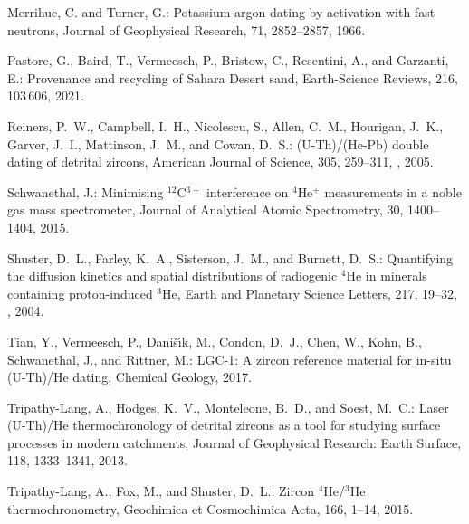 \documentclass{article}
\begin{document}
\begin{thebibliography}{24}
Merrihue, C. and Turner, G.: Potassium-argon dating by activation with fast
  neutrons, Journal of Geophysical Research, 71, 2852--2857, 1966.

Pastore, G., Baird, T., Vermeesch, P., Bristow, C., Resentini, A., and
  Garzanti, E.: {Provenance and recycling of Sahara Desert sand}, Earth-Science
  Reviews, 216, 103\,606, 2021.

Reiners, P.~W., Campbell, I.~H., Nicolescu, S., Allen, C.~M., Hourigan, J.~K.,
  Garver, J.~I., Mattinson, J.~M., and Cowan, D.~S.: {(U-Th)/(He-Pb) double
  dating of detrital zircons}, American Journal of Science, 305, 259--311,
  , 2005.

Schwanethal, J.: {Minimising $^{12}$C$^{3+}$ interference on $^4$He$^+$
  measurements in a noble gas mass spectrometer}, Journal of Analytical Atomic
  Spectrometry, 30, 1400--1404, 2015.

{Shuster}, D.~L., {Farley}, K.~A., {Sisterson}, J.~M., and {Burnett}, D.~S.:
  {Quantifying the diffusion kinetics and spatial distributions of radiogenic
  $^{4}$He in minerals containing proton-induced $^{3}$He}, Earth and Planetary
  Science Letters, 217, 19--32, , 2004.

Tian, Y., Vermeesch, P., Dani{\v{s}}{\'\i}k, M., Condon, D.~J., Chen, W., Kohn,
  B., Schwanethal, J., and Rittner, M.: {LGC-1: A zircon reference material for
  in-situ (U-Th)/He dating}, Chemical Geology, 2017.

Tripathy-Lang, A., Hodges, K.~V., Monteleone, B.~D., and Soest, M.~C.: Laser
  (U-Th)/He thermochronology of detrital zircons as a tool for studying surface
  processes in modern catchments, Journal of Geophysical Research: Earth
  Surface, 118, 1333--1341, 2013.

Tripathy-Lang, A., Fox, M., and Shuster, D.~L.: Zircon $^4$He/$^3$He
  thermochronometry, Geochimica et Cosmochimica Acta, 166, 1--14, 2015.


\end{thebibliography}
\end{document}
